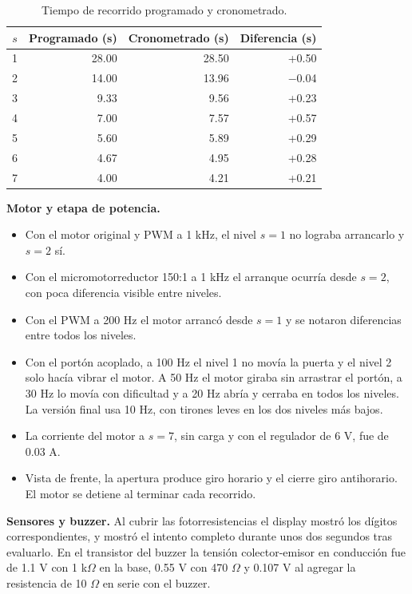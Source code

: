 \documentclass[12pt,letterpaper]{article}
\begin{document}
\begin{table}[H]
\centering
\begin{tabular}{@{}crrr@{}}
\toprule
$s$ & Programado (s) & Cronometrado (s) & Diferencia (s)\\
\midrule
1 & 28.00 & 28.50 & +0.50\\
2 & 14.00 & 13.96 & $-$0.04\\
3 & 9.33 & 9.56 & +0.23\\
4 & 7.00 & 7.57 & +0.57\\
5 & 5.60 & 5.89 & +0.29\\
6 & 4.67 & 4.95 & +0.28\\
7 & 4.00 & 4.21 & +0.21\\
\bottomrule
\end{tabular}
\caption{Tiempo de recorrido programado y cronometrado.}
\label{tab:timer}
\end{table}

\textbf{Motor y etapa de potencia.}
\begin{itemize}
    \item Con el motor original y PWM a 1 kHz, el nivel
    $s=1$ no lograba arrancarlo y $s=2$ sí.
    \item Con el micromotorreductor 150:1 a 1 kHz el
    arranque ocurría desde $s=2$, con poca diferencia
    visible entre niveles.
    \item Con el PWM a 200 Hz el motor arrancó desde $s=1$
    y se notaron diferencias entre todos los niveles.
    \item Con el portón acoplado, a 100 Hz el nivel 1 no
    movía la puerta y el nivel 2 solo hacía vibrar el
    motor. A 50 Hz el motor giraba sin arrastrar el
    portón, a 30 Hz lo movía con dificultad y a 20 Hz
    abría y cerraba en todos los niveles. La versión final
    usa 10 Hz, con tirones leves en los dos niveles más
    bajos.
    \item La corriente del motor a $s=7$, sin carga y con
    el regulador de 6 V, fue de 0.03 A.
    \item Vista de frente, la apertura produce giro horario
    y el cierre giro antihorario. El motor se detiene al
    terminar cada recorrido.
\end{itemize}

\textbf{Sensores y buzzer.} Al cubrir las fotorresistencias
el display mostró los dígitos correspondientes, y mostró el intento
completo durante unos dos segundos tras evaluarlo. En el
transistor del buzzer la tensión colector-emisor en
conducción fue de 1.1 V con 1 k$\Omega$ en la base,
0.55 V con 470 $\Omega$ y 0.107 V al agregar la
resistencia de 10 $\Omega$ en serie con el buzzer.
\end{document}
